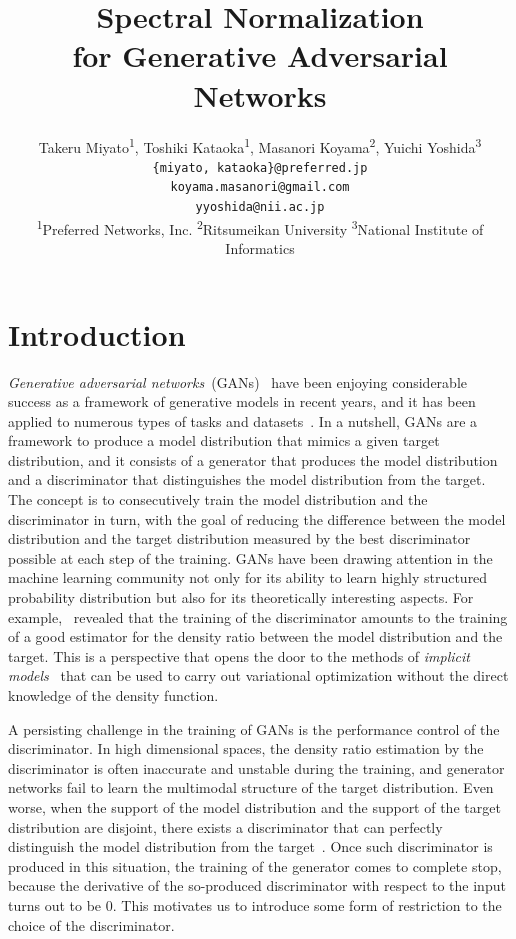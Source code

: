 \documentclass{article}
\title{Spectral Normalization\\ for Generative Adversarial Networks}
\author{Takeru Miyato\textsuperscript{1}, Toshiki Kataoka\textsuperscript{1}, Masanori Koyama\textsuperscript{2}, Yuichi Yoshida\textsuperscript{3}\\
\texttt{\{miyato, kataoka\}@preferred.jp} \\
\texttt{koyama.masanori@gmail.com} \\
\texttt{yyoshida@nii.ac.jp} \\
\textsuperscript{1}Preferred Networks, Inc.
\textsuperscript{2}Ritsumeikan University
\textsuperscript{3}National Institute of Informatics
}
\begin{document}
\maketitle



\section{Introduction}
\textit{Generative adversarial networks}~(GANs)~\cite[]{goodfellow2014generative} have been enjoying considerable success as a framework of generative models in recent years, and it has been applied to numerous types of tasks and datasets~\cite[]{radford2015unsupervised, salimans2016improved, ho2016generative, li2017adversarial}.
In a nutshell, GANs are a framework to produce a model distribution that mimics a given target distribution,
and it consists of a generator that produces the model distribution and a discriminator that distinguishes the model distribution from the target.
The concept is to consecutively train the model distribution and the discriminator in turn,
with the goal of reducing the difference between the model distribution and the target distribution measured by the best discriminator possible at each step of the training.
GANs have been drawing attention in the machine learning community not only for its ability to learn highly structured probability distribution but also for its theoretically interesting aspects.
For example,~\cite[]{nowozin2016f, uehara2016generative, mohamed2016learning} revealed that the training of the discriminator amounts to the training of a good estimator for the density ratio between the model distribution and the target.
This is a perspective that opens the door to the methods of
\textit{implicit models}~\cite[]{mohamed2016learning, tran2017deep} that can be used to carry out variational optimization without the direct knowledge of the density function.

A persisting challenge in the training of GANs is the performance control of the discriminator. In high dimensional spaces, the density ratio estimation by the discriminator is often inaccurate and unstable during the training, and generator networks fail to learn the multimodal structure of the target distribution.
Even worse, when the support of the model distribution and the support of the target distribution are disjoint, there exists a discriminator that can perfectly distinguish the model distribution from the target~\cite[]{arjovsky2017towards}.
Once such discriminator is produced in this situation, the training of the generator comes to complete stop, because the derivative of the so-produced discriminator with respect to the input turns out to be 0.
This motivates us to introduce some form of restriction to the choice of the discriminator.
\end{document}
